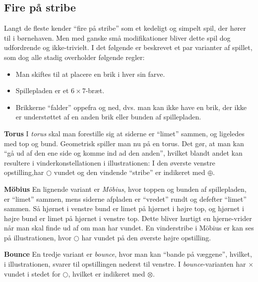 \subsection{Fire på stribe}
Langt de fleste kender ``fire på stribe'' som et kedeligt og simpelt spil, der hører til i børnehaven. Men med ganske små modifikationer bliver dette spil dog udfordrende og ikke-trivielt. I det følgende er beskrevet et par varianter af spillet, som dog alle stadig overholder følgende regler:
\begin{itemize}
    \item Man skiftes til at placere en brik i hver sin farve.
    \item Spillepladen er et $6\times7$-bræt.
    \item Brikkerne ``falder'' oppefra og ned, dvs. man kan ikke have en brik, der ikke er understøttet af en anden brik eller bunden af spillepladen.
\end{itemize}

\vspace{12pt}\noindent\textbf{Torus}\newline
I \textit{torus} skal man forestille sig at siderne er ``limet'' sammen, og ligeledes med top og bund. Geometrisk spiller man nu på en torus. Det gør, at man kan ``gå ud af den ene side og komme ind ad den anden'', hvilket blandt andet kan resultere i vinderkonstellationen i illustrationen: I den øverste venstre opstilling,har {\scriptsize$\bigcirc$} vundet og den vindende ``stribe'' er indikeret med $\oplus$.\newline

\noindent\textbf{Möbius}\newline
En lignende variant er \textit{Möbius}, hvor toppen og bunden af spillepladen, er ``limet'' sammen, mens siderne afpladen er ``vredet'' rundt og defefter ``limet'' sammen. Så hjørnet i venstre bund er limet på hjørnet i højre top, og hjørnet i højre bund er limet på hjørnet i venstre top. Dette bliver hurtigt en hjerne-vrider når man skal finde ud af om man har vundet. En vinderstribe i Möbius er kan ses på illustrationen, hvor {\scriptsize$\bigcirc$} har vundet på den øverste højre opstilling.\newline

\noindent\textbf{Bounce}\newline
En tredje variant er \textit{bounce}, hvor man kan ``bande på væggene'', hvilket, i illustrationen, svarer til opstillingen nederst til venstre. I \textit{bounce}-varianten har $\times$ vundet i stedet for {\scriptsize$\bigcirc$}, hvilket er indikeret med $\otimes$.\newline

